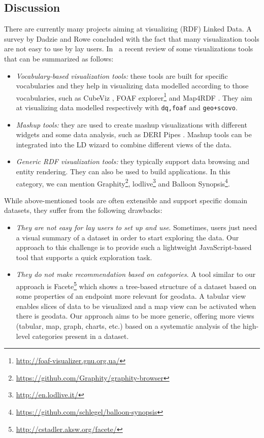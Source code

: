 \subsection{Discussion}
\label{sec:discussion}
There are currently many projects aiming at visualizing (RDF) Linked Data. A survey by Dadzie and Rowe \cite{Dadzie:2011} concluded with the fact that many visualization tools are not easy to use by lay users. In~\cite{Klimek2014} a recent review of some visualizations tools that can be summarized as follows:
\begin{itemize}
 \item \textit{Vocabulary-based visualization tools:} these tools are built for specific vocabularies and they help in visualizing data modelled according to those vocabularies, such as CubeViz \cite{cubeviz:2012}, FOAF explorer\footnote{\url{http://foaf-visualizer.gnu.org.ua/}} and Map4RDF \cite{leon2012}. They aim at visualizing data modelled respectively with \texttt{dq,foaf} and \texttt{geo+scovo}.
 \item \textit{Mashup tools:} they are used to create mashup visualizations with different widgets and some data analysis, such as DERI Pipes \cite{danh2009}. Mashup tools can be integrated into the LD wizard to combine different views of the data.
 \item \textit{Generic RDF visualization tools:} they typically support data browsing and entity rendering. They can also be used to build applications. In this category, we can mention Graphity\footnote{\url{https://github.com/Graphity/graphity-browser}}, lodlive\footnote{\url{http://en.lodlive.it/}} and Balloon Synopsis\footnote{\url{https://github.com/schlegel/balloon-synopsis}}.
\end{itemize}
While above-mentioned tools are often extensible and support specific domain datasets, they suffer from the following drawbacks:
\begin{itemize}
 \item \textit{They are not easy for lay users to set up and use}. Sometimes, users just need a visual summary of a dataset in order to start exploring the data. Our approach to this challenge is to provide such a lightweight JavaScript-based tool that supports a quick exploration task.
 \item \textit{They do not make recommendation based on categories}. A tool similar to our approach is Facete\footnote{\url{http://cstadler.aksw.org/facete/}}\cite{facete:2014} which shows a tree-based structure of a dataset based on some properties of an endpoint more relevant for geodata. A tabular view enables slices of data to be visualized and a map view can be activated when there is geodata. Our approach aims to be more generic, offering more views (tabular, map, graph, charts, etc.) based on a systematic analysis of the high-level categories present in a dataset.
\end{itemize}

